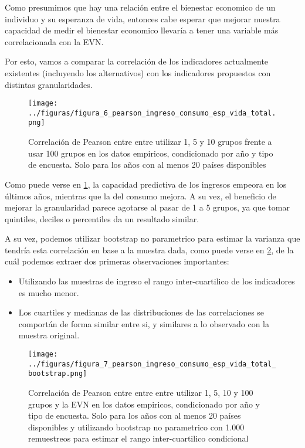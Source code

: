 Como presumimos que hay una relación entre el bienestar economico de un individuo y su esperanza de vida, entonces cabe esperar que mejorar nuestra capacidad de medir el bienestar economico llevaría a tener una variable más correlacionada con la EVN.

Por esto, vamos a comparar la correlación de los indicadores actualmente existentes (incluyendo los alternativos) con los indicadores propuestos con distintas granularidades.


\begin{figure}[H] %
    \centering %
    \texttt{[image: ../figuras/figura\_6\_pearson\_ingreso\_consumo\_esp\_vida\_total.png]} %
    \caption{Correlación de Pearson entre entre utilizar 1, 5 y 10 grupos frente a usar 100 grupos en los datos empiricos, condicionado por año y tipo de encuesta. Solo para los años con al menos 20 países disponibles}
    \label{fig:6} %
\end{figure}

Como puede verse en \ref{fig:6}, la capacidad predictiva de los ingresos empeora en los últimos años, mientras que la del consumo mejora. A su vez, el beneficio de mejorar la granularidad parece agotarse al pasar de 1 a 5 grupos, ya que tomar quintiles, deciles o percentiles da un resultado similar.

A su vez, podemos utilizar bootstrap no parametrico para estimar la varianza que tendría esta correlación en base a la muestra dada, como puede verse en \ref{fig:7}, de la cuál podemos extraer dos primeras observaciones importantes:

\begin{itemize}
    \item Utilizando las muestras de ingreso el rango inter-cuartilico de los indicadores es mucho menor.
    \item Los cuartiles y medianas de las distribuciones de las correlaciones se comportán de forma similar entre si, y similares a lo observado con la muestra original.
\end{itemize}

\begin{figure}[H] %
    \centering %
    \texttt{[image: ../figuras/figura\_7\_pearson\_ingreso\_consumo\_esp\_vida\_total\_bootstrap.png]} %
    \caption{Correlación de Pearson entre entre entre utilizar 1, 5, 10 y 100 grupos y la EVN en los datos empiricos, condicionado por año y tipo de encuesta. Solo para los años con al menos 20 países disponibles y utilizando bootstrap no parametrico con 1.000 remuestreos para estimar el rango inter-cuartilico condicional}
    \label{fig:7} %
\end{figure}

